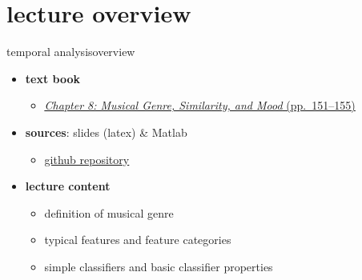 

\subtitle{Part 9.1: Genre Classification}


	

    \section[overview]{lecture overview}
        \begin{frame}{temporal analysis}{overview}
            \begin{itemize}
                \item   \textbf{text book}  
                    \begin{itemize}
                        \item   \href{http://ieeexplore.ieee.org/xpl/articleDetails.jsp?tp=&arnumber=6331125&}{\underline{\textit{Chapter 8: Musical Genre, Similarity, and Mood} (pp.~151--155)}}
                    \end{itemize}
                \item   \textbf{sources}: slides (latex) \& Matlab  
                    \begin{itemize}
                        \item   \href{https://github.com/alexanderlerch/ACA-Slides}{\underline{github repository}}
                    \end{itemize}
                \bigskip
                \item<2->   \textbf{lecture content}
                    \begin{itemize}
                        \item<2->   definition of musical genre
                        \item<3->   typical features and feature categories
                        \item<4->   simple classifiers and basic classifier properties
                    \end{itemize}
            \end{itemize}
        \end{frame}

